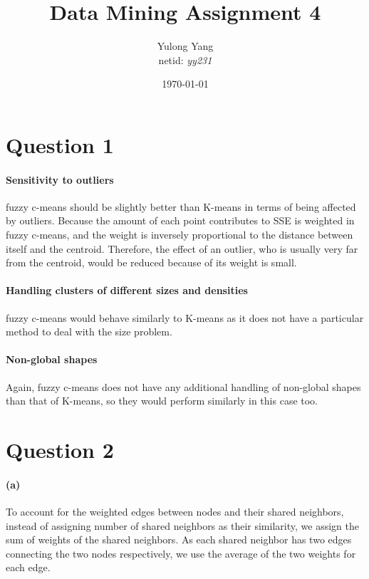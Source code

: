 \documentclass[paper=a4, fontsize=11pt]{scrartcl} %
\title{Data Mining Assignment 4}
\author{Yulong Yang\\ netid: \textit{yy231}} %
\date{\normalsize\today} %
\begin{document}
\maketitle %

\section*{Question 1}

\paragraph{Sensitivity to outliers} fuzzy c-means should be slightly better than K-means in terms of being affected by outliers. Because the amount of each point contributes to SSE is weighted in fuzzy c-means, and the weight is inversely proportional to the distance between itself and the centroid. Therefore, the effect of an outlier, who is usually very far from the centroid, would be reduced because of its weight is small.

\paragraph{Handling clusters of different sizes and densities} fuzzy c-means would behave similarly to K-means as it does not have a particular method to deal with the size problem.

\paragraph{Non-global shapes} Again, fuzzy c-means does not have any additional handling of non-global shapes than that of K-means, so they would perform similarly in this case too.

\section*{Question 2}

\paragraph{(a)} To account for the weighted edges between nodes and their shared neighbors, instead of assigning number of shared neighbors as their similarity, we assign the sum of weights of the shared neighbors. As each shared neighbor has two edges connecting the two nodes respectively, we use the average of the two weights for each edge.
\end{document}
